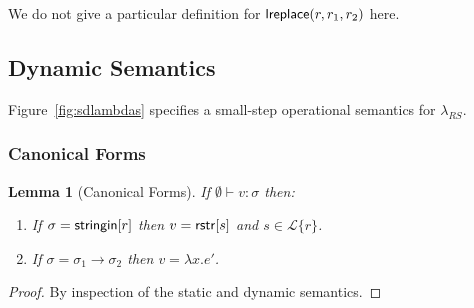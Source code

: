 \documentclass[11pt,leqno]{article}
\newtheorem{trlem}[tr]{Lemma}
\theoremstyle{definition}
\newcommand{\Lagr}{\mathcal{L}}
\newcommand{\lang}[1]{\Lagr\{#1\}}
\newcommand{\lambdas}{\lambda_{RS}}
\newcommand{\stringin}[1]{{\sf stringin}[#1]}
\newcommand{\lreplace}[3]{{\sf lreplace}(#1; #2; #3)}
\renewcommand{\lreplace}[3]{{\sf lreplace}(#1, #2, #3)}
\begin{document}
We do not give a particular definition for $\lreplace{r}{r_1}{r_2}$ here.

\subsection{Dynamic Semantics}
Figure~\ref{fig:sdlambdas} specifies a small-step operational semantics for $\lambdas$. 

\subsubsection{Canonical Forms}
\begin{trlem}[Canonical Forms]\label{cfgen}
If $\emptyset \vdash v : \sigma$ then:
\begin{enumerate}
\item If $\sigma = \stringin{r}$ then $v = {\sf rstr}[s]$ and $s \in \lang{r}$.
\item If $\sigma = \sigma_1 \rightarrow \sigma_2$ then $v = \lambda x . e'$.
\end{enumerate}

\end{trlem}
\begin{proof}
By inspection of the static and dynamic semantics.
\end{proof}
\end{document}
